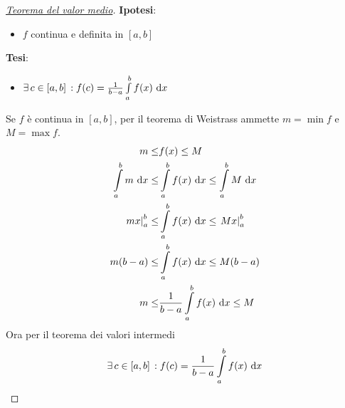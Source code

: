 \begin{proof}
  [\protect\hyperlink{teor:media}{Teorema del valor medio}]
  \textbf{Ipotesi}:
  \begin{itemize}
    \item $f$ continua e definita in $[a,b]$
  \end{itemize}
  \textbf{Tesi}:
  \begin{itemize}
    \item $\exists\,c\in[a,b]\,: f(c)=\frac{1}{b-a}\int\limits_{a}^{b} f(x)\,\mathop{}\!\mathrm{d} x$
  \end{itemize}
  \divisor

  Se $f$ è continua in $[a,b]$, per il teorema di Weistrass ammette $m=\min f$ e $M=\max f$.
  \begin{align*}
    m\leq &f(x) \leq M\\
    \int\limits_{a}^{b} m\,\mathop{}\!\mathrm{d} x\leq
    &\int\limits_{a}^{b}f(x)\,\mathop{}\!\mathrm{d} x\leq\int\limits_{a}^{b}M\,\mathop{}\!\mathrm{d} x\\
    \left.mx\right|_a^b\leq &\int\limits_{a}^{b} f(x)\,\mathop{}\!\mathrm{d} x\leq \left.Mx\right|_a^b\\
    m(b-a)\leq &\int\limits_{a}^{b} f(x)\,\mathop{}\!\mathrm{d} x\leq M(b-a)\\
    m\leq &\frac{1}{b-a}\int\limits_{a}^{b} f(x)\,\mathop{}\!\mathrm{d} x\leq M
  \end{align*}
  Ora per il teorema dei valori intermedi
  \begin{equation*}
    \exists\,c\in[a,b]\,: f(c)=\frac{1}{b-a}\int\limits_{a}^{b} f(x)\,\mathop{}\!\mathrm{d} x
  \end{equation*}
\end{proof}

